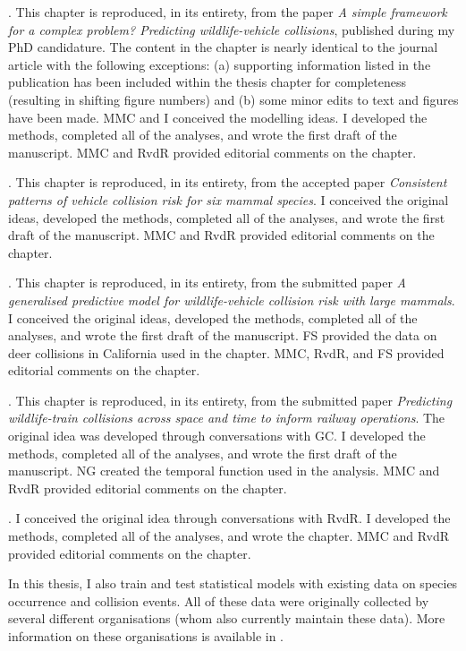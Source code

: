 \documentclass[titlesmallcaps,copyrightpage,examinerscopy]{uomthesis}
\begin{document}
. This chapter is reproduced, in its entirety, from the paper \textit{A simple framework for a complex problem?  Predicting wildlife-vehicle collisions}, published during my PhD candidature. The content in the chapter is nearly identical to the journal article with the following exceptions: (a) supporting information listed in the publication has been included within the thesis chapter for completeness (resulting in shifting figure numbers) and (b) some minor edits to text and figures have been made. MMC and I conceived the modelling ideas. I developed the methods, completed all of the analyses, and wrote the first draft of the manuscript. MMC and RvdR provided editorial comments on the chapter.

. This chapter is reproduced, in its entirety, from the accepted paper \textit{Consistent patterns of vehicle collision risk for six mammal species}. I conceived the original ideas, developed the methods, completed all of the analyses, and wrote the first draft of the manuscript. MMC and RvdR provided editorial comments on the chapter.

. This chapter is reproduced, in its entirety, from the submitted paper \textit{A generalised predictive model for wildlife-vehicle collision risk with large mammals}. I conceived the original ideas, developed the methods, completed all of the analyses, and wrote the first draft of the manuscript. FS provided the data on deer collisions in California used in the chapter. MMC, RvdR, and FS provided editorial comments on the chapter.

. This chapter is reproduced, in its entirety, from the submitted paper \textit{Predicting wildlife-train collisions across space and time to inform railway operations}. The original idea was developed through conversations with GC. I developed the methods, completed all of the analyses, and wrote the first draft of the manuscript. NG created the temporal function used in the analysis. MMC and RvdR provided editorial comments on the chapter.

. I conceived the original idea through conversations with RvdR. I developed the methods, completed all of the analyses, and wrote the chapter. MMC and RvdR provided editorial comments on the chapter.

In this thesis, I also train and test statistical models with existing data on species occurrence and collision events. All of these data were originally collected by several different organisations (whom also currently maintain these data). More information on these organisations is available in .
\end{document}
